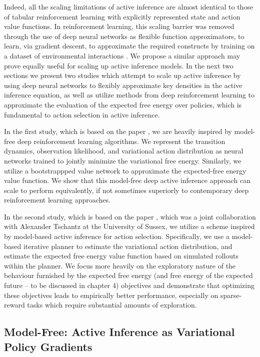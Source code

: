 Indeed, all the scaling limitations of active inference are almost identical to those of tabular reinforcement learning with explicitly represented state and action value functions. In reinforcement learning, this scaling barrier was removed through the use of deep neural networks as flexible function approximators, to learn, via gradient descent, to approximate the required constructs by training on a dataset of environmental interactions \citep{sutton2018reinforcement}. We propose a similar approach may prove equally useful for scaling up active inference models. In the next two sections we present two studies which attempt to scale up active inference by using deep neural networks to flexibly approximate key densities in the active inference equation, as well as utilize methods from deep reinforcement learning to approximate the evaluation of the expected free energy over policies, which is fundamental to action selection in active inference. 

In the first study, which is based on the paper \citep{millidge_deep_2019}, we are heavily inspired by model-free deep reinforcement learning algorithms. We represent the transition dynamics, observation likelihood, and variational action distribution as neural networks trained to jointly minimize the variational free energy. Similarly, we utilize a bootstrappped value network to approximate the expected-free energy value function. We show that this model-free deep active inference approach can scale to perform equivalently, if not sometimes superiorly to contemporary deep reinforcement learning approaches.

In the second study, which is based on the paper \citep{tschantz2020reinforcement}, which was a joint collaboration with Alexander Tschantz at the University of Sussex, we utilize a scheme inspired by model-based active inference for action selection. Specifically, we use a model-based iterative planner to estimate the variational action distribution, and estimate the expected free energy value function based on simulated rollouts within the planner. We focus more heavily on the exploratory nature of the behaviour furnished by the expected free energy (and free energy of the expected future -- to be discussed in chapter 4) objectives and demonstrate that optimizing these objectives leads to empirically better performance, especially on sparse-reward tasks which require substantial amounts of exploration.


\subsection{Model-Free: Active Inference as Variational Policy Gradients}


